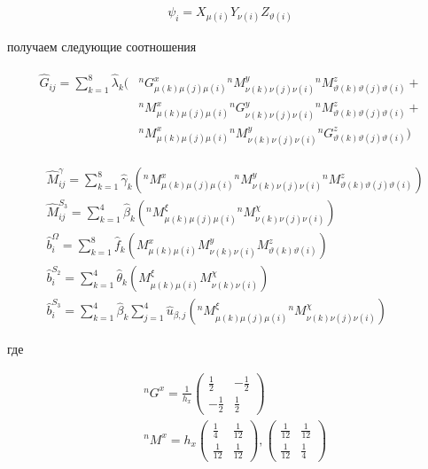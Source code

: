\documentclass[12pt]{article}
\begin{document}
\begin{align}
  \psi_i = X_{\mu(i)}Y_{\nu(i)}Z_{\vartheta(i)}
\end{align}

\vskip 2mm
\noindent получаем следующие соотношения

\begin{align}
  \begin{split}
    \hat{G}_{ij} = \sum_{k=1}^{8}\hat{\lambda}_{k}(
      &{}^{n}G^{x}_{\mu(k)\mu(j)\mu(i)}{}^{n}M^{y}_{\nu(k)\nu(j)\nu(i)}{}^{n}M^{z}_{\vartheta(k)\vartheta(j)\vartheta(i)}+\\
      &{}^{n}M^{x}_{\mu(k)\mu(j)\mu(i)}{}^{n}G^{y}_{\nu(k)\nu(j)\nu(i)}{}^{n}M^{z}_{\vartheta(k)\vartheta(j)\vartheta(i)}+\\
      &{}^{n}M^{x}_{\mu(k)\mu(j)\mu(i)}{}^{n}M^{y}_{\nu(k)\nu(j)\nu(i)}{}^{n}G^{z}_{\vartheta(k)\vartheta(j)\vartheta(i)}
    )
  \end{split}
\end{align}

\begin{align}
  &\hat{M}^{\gamma}_{ij} = \sum_{k=1}^{8}\hat{\gamma}_{k}(
      {}^{n}M^{x}_{\mu(k)\mu(j)\mu(i)}{}^{n}M^{y}_{\nu(k)\nu(j)\nu(i)}{}^{n}M^{z}_{\vartheta(k)\vartheta(j)\vartheta(i)}
  ) \\
  &\hat{M}^{S_3}_{ij} = \sum_{k=1}^{4}\hat{\beta}_{k}(
      {}^{n}M^{\xi}_{\mu(k)\mu(j)\mu(i)}{}^{n}M^{\chi}_{\nu(k)\nu(j)\nu(i)}
  ) \\
  &\hat{b}^{\Omega}_{i} = \sum_{k=1}^{8}\hat{f}_{k}(
      M^{x}_{\mu(k)\mu(i)}M^{y}_{\nu(k)\nu(i)}M^{z}_{\vartheta(k)\vartheta(i)}
  ) \\
  &\hat{b}^{S_2}_{i} = \sum_{k=1}^{4}\hat{\theta}_{k}(
      M^{\xi}_{\mu(k)\mu(i)}M^{\chi}_{\nu(k)\nu(i)}
  ) \\
  &\hat{b}^{S_3}_{i} = \sum_{k=1}^{4}\hat{\beta}_{k}\sum_{j=1}^{4}\hat{u}_{\beta, j}(
      {}^{n}M^{\xi}_{\mu(k)\mu(j)\mu(i)}{}^{n}M^{\chi}_{\nu(k)\nu(j)\nu(i)}
  )
\end{align}

\vskip 5mm
\noindent где

\begin{align}
  &{}^{n}G^{x} = \frac{1}{h_x}
    \begin{pmatrix}
      \frac{1}{2} & -\frac{1}{2} \\
      -\frac{1}{2} & \frac{1}{2}
    \end{pmatrix} \\
  &{}^{n}M^{x} = h_x
    \begin{pmatrix}
      \frac{1}{4} & \frac{1}{12} \\
      \frac{1}{12} & \frac{1}{12}
    \end{pmatrix},
    \begin{pmatrix}
      \frac{1}{12} & \frac{1}{12} \\
      \frac{1}{12} & \frac{1}{4}
    \end{pmatrix}
\end{align}
\end{document}
